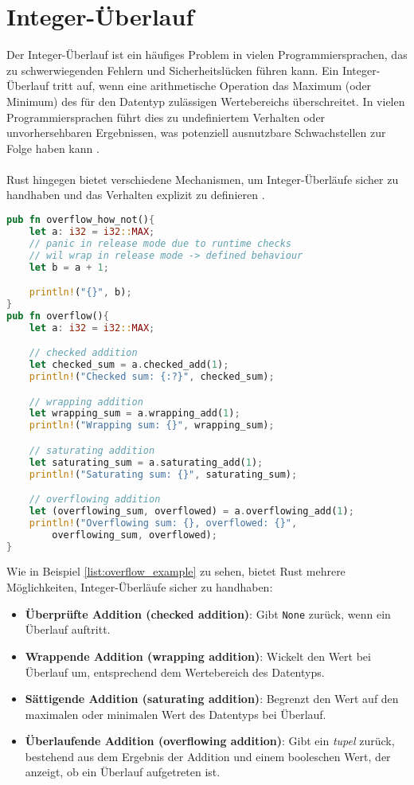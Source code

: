  \chapter{Integer-Überlauf}


Der Integer-Überlauf ist ein häufiges Problem in vielen Programmiersprachen, das zu schwerwiegenden Fehlern und Sicherheitslücken führen kann. 
Ein Integer-Überlauf tritt auf, wenn eine arithmetische Operation das Maximum (oder Minimum) des für den Datentyp zulässigen Wertebereichs überschreitet.
In vielen Programmiersprachen führt dies zu undefiniertem Verhalten oder unvorhersehbaren Ergebnissen, was potenziell ausnutzbare Schwachstellen zur Folge haben kann \cite{cwe190}.\\
\\
Rust hingegen bietet verschiedene Mechanismen, um Integer-Überläufe sicher zu handhaben und das Verhalten explizit zu definieren \cite[Kapitel 3.2]{rust2023}. 

\begin{lstlisting}[language=Rust, caption= Integer-Überläufe, label=list:overflow_example]
pub fn overflow_how_not(){
    let a: i32 = i32::MAX;
    // panic in release mode due to runtime checks
    // wil wrap in release mode -> defined behaviour
    let b = a + 1;  

    println!("{}", b);
}
pub fn overflow(){
    let a: i32 = i32::MAX;

    // checked addition 
    let checked_sum = a.checked_add(1);
    println!("Checked sum: {:?}", checked_sum);  

    // wrapping addition 
    let wrapping_sum = a.wrapping_add(1);
    println!("Wrapping sum: {}", wrapping_sum);  

    // saturating addition 
    let saturating_sum = a.saturating_add(1);
    println!("Saturating sum: {}", saturating_sum);  

    // overflowing addition 
    let (overflowing_sum, overflowed) = a.overflowing_add(1);
    println!("Overflowing sum: {}, overflowed: {}",
        overflowing_sum, overflowed);  
}
\end{lstlisting}
\cleardoublepage
\noindent
Wie in Beispiel \ref{list:overflow_example} zu sehen, bietet Rust mehrere Möglichkeiten, Integer-Überläufe sicher zu handhaben:

\begin{itemize}
\item \textbf{Überprüfte Addition (checked addition)}: Gibt \texttt{None} zurück, wenn ein Überlauf auftritt.
\item \textbf{Wrappende Addition (wrapping addition)}: Wickelt den Wert bei Überlauf um, entsprechend dem Wertebereich des Datentyps.
\item \textbf{Sättigende Addition (saturating addition)}: Begrenzt den Wert auf den maximalen oder minimalen Wert des Datentyps bei Überlauf.
\item \textbf{Überlaufende Addition (overflowing addition)}: Gibt ein \textit{\gls{tupel}} zurück, bestehend aus dem Ergebnis der Addition und einem booleschen Wert, der anzeigt, ob ein Überlauf aufgetreten ist.
\end{itemize}
